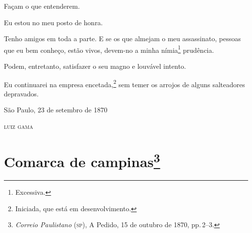 Façam o que entenderem.

Eu estou no meu posto de honra.

Tenho amigos em toda a parte. E se os que almejam o meu assassinato,
pessoas que eu bem conheço, estão vivos, devem-no a minha
nímia\footnote{ Excessiva.} prudência.

Podem, entretanto, satisfazer o seu magno e louvável intento.

Eu continuarei na empresa encetada,\footnote{ Iniciada, que está em
  desenvolvimento.} sem temer os arrojos de alguns salteadores
depravados.

\begin{flushright}
São Paulo, 23 de setembro de 1870

\textsc{luiz gama}
\end{flushright}

\chapter{Comarca de campinas\footnote{\emph{Correio Paulistano} (\textsc{sp}), A Pedido, 15 de outubro de 1870,
  pp.\,2--3.}} %

